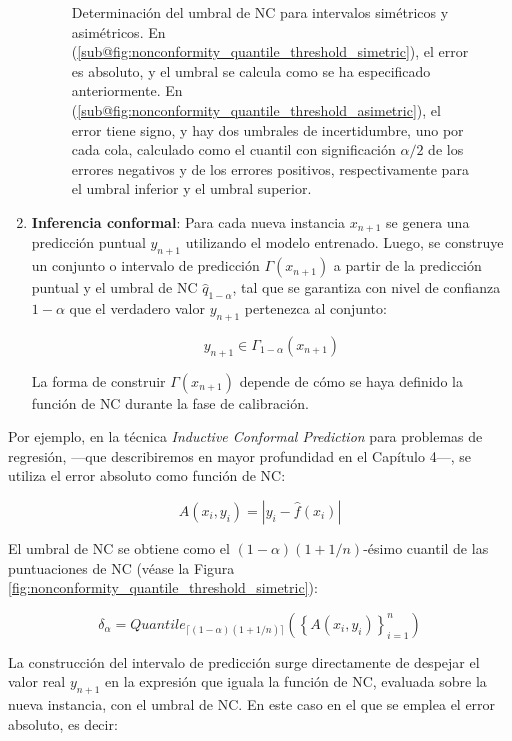 \begin{enumerate}
\begin{figure}[htbp]
        \caption[
            Determinación del umbral de NC para intervalos simétricos y asimétricos.
        ]{
            Determinación del umbral de NC para intervalos simétricos y asimétricos. 
            En (\ref{sub@fig:nonconformity_quantile_threshold_simetric}), el error es absoluto, y el umbral
            se calcula como se ha especificado anteriormente. 
            En (\ref{sub@fig:nonconformity_quantile_threshold_asimetric}), el error tiene signo, y hay dos
            umbrales de incertidumbre, uno por cada cola, calculado como el cuantil con significación
            $\alpha/2$ de los errores negativos y de los errores positivos, respectivamente para el umbral
            inferior y el umbral superior. 
        }
        \label{fig:nonconformity_quantile_comparison}
    \end{figure}


    \item \textbf{Inferencia conformal}: Para cada nueva instancia $x_{n+1}$ se genera una predicción puntual
    $y_{n+1}$ utilizando el modelo entrenado. Luego, se construye un conjunto o intervalo de predicción
    $\Gamma(x_{n+1})$ a partir de la predicción puntual y el umbral de \acrshort{NC} $\hat{q}_{1-\alpha}$, 
    tal que se garantiza con nivel de confianza $1-\alpha$ que el verdadero valor $y_{n+1}$ pertenezca al
    conjunto:
    
    $$
    y_{n+1} \in \Gamma_{1-\alpha}(x_{n+1})
    $$

    La forma de construir $\Gamma(x_{n+1})$ depende de cómo se haya definido la función de \acrshort{NC} 
    durante la fase de calibración.

\end{enumerate}




Por ejemplo, en la técnica \textit{Inductive Conformal Prediction} \cite{papadopoulos2002} para problemas de regresión, ---que describiremos en mayor profundidad en el Capítulo 4---, se utiliza el error absoluto como función de \acrshort{NC}:

$$
A(x_i, y_i) = | y_i - \hat{f}(x_i) |
$$

El umbral de \acrshort{NC} se obtiene como el $(1 - \alpha)(1 + 1/n)$-ésimo cuantil de las puntuaciones de \acrshort{NC} (véase la Figura \ref{fig:nonconformity_quantile_threshold_simetric}):

$$
\delta_\alpha = Quantile_{ \lceil  (1-\alpha) (1 + 1/n)  \rceil } ( \left\{ A(x_i,y_i) \right\}_{i=1}^n )
$$

La construcción del intervalo de predicción surge directamente de despejar el valor real $y_{n+1}$ en la expresión que iguala la función de \acrshort{NC}, evaluada sobre la nueva instancia, con el umbral de \acrshort{NC}. En este caso en el que se emplea el error absoluto, es decir:

